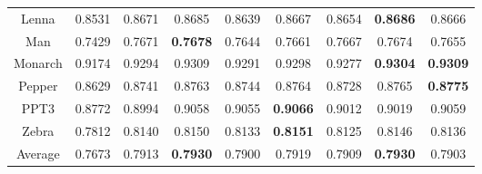 \documentclass[review,numbers,sort&compress]{elsarticle}  %
\begin{document}
\begin{table}[]
{\begin{tabular}{@{}ccccccccc@{}}
\multicolumn{1}{c|}{Lenna}      & 0.8531  & 0.8671 & 0.8685          & 0.8639          & 0.8667          & 0.8654 & \textbf{0.8686} & 0.8666         \\
\multicolumn{1}{c|}{Man}        & 0.7429  & 0.7671 & \textbf{0.7678} & 0.7644          & 0.7661          & 0.7667 & 0.7674          & 0.7655          \\
\multicolumn{1}{c|}{Monarch}    & 0.9174  & 0.9294 & 0.9309          & 0.9291          & 0.9298          & 0.9277 & \textbf{0.9304} & \textbf{0.9309} \\
\multicolumn{1}{c|}{Pepper}     & 0.8629  & 0.8741 & 0.8763          & 0.8744          & 0.8764          & 0.8728 & 0.8765          & \textbf{0.8775} \\
\multicolumn{1}{c|}{PPT3}       & 0.8772  & 0.8994 & 0.9058          & 0.9055          & \textbf{0.9066} & 0.9012 & 0.9019          & 0.9059          \\
\multicolumn{1}{c|}{Zebra}      & 0.7812  & 0.8140 & 0.8150          & 0.8133          & \textbf{0.8151} & 0.8125 & 0.8146          & 0.8136          \\
\multicolumn{1}{c|}{Average}    & 0.7673  & 0.7913 & \textbf{0.7930} & 0.7900          & 0.7919          & 0.7909 & \textbf{0.7930} & 0.7903 \\ \bottomrule
\end{tabular}}
\end{table}
\end{document}
